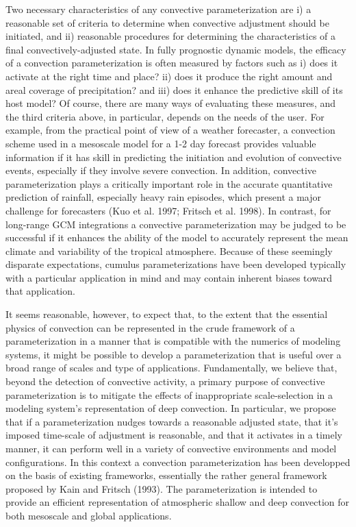 Two necessary characteristics of any convective parameterization are i) a
reasonable set of criteria to determine when convective adjustment should be
initiated, and ii) reasonable procedures for determining the characteristics of
a final convectively-adjusted state.
 In fully
prognostic dynamic models, the efficacy of a convection parameterization is
often measured by factors such as  i)  does it activate at the right time and
place?  ii)  does it produce the right amount and areal coverage of
precipitation?  and iii)  does it enhance the predictive skill of
its host model?
Of course, there are many ways of evaluating these measures, and the third
criteria above, in particular, depends on the needs of the user.  For example,
from the practical point of view of a weather forecaster, a convection scheme
used in a mesoscale model for a 1-2 day forecast provides valuable information
if it has skill in predicting the initiation and evolution of convective events,
especially if they involve severe convection.  In addition, convective
parameterization plays a critically important role in the accurate quantitative
prediction of rainfall, especially heavy rain episodes, which present a major
challenge for forecasters (Kuo et al. 1997; Fritsch et al. 1998).
In contrast,  for long-range
GCM integrations a convective parameterization may be judged to be successful if
it enhances the ability of the model to accurately represent the mean climate
and variability of the tropical atmosphere.  Because of these seemingly
disparate expectations, cumulus parameterizations have been developed typically
with a particular application in mind and may contain inherent biases toward
that application.

It seems reasonable, however, to expect that, to the extent that the essential
physics of convection can be represented in the crude framework of a
parameterization in a manner that is compatible with the numerics of modeling
systems, it might be possible to develop a parameterization that is useful over
a broad range of scales and type of applications.  Fundamentally, we believe
that, beyond the detection of convective activity, a primary purpose of
convective parameterization is to mitigate the effects of inappropriate
scale-selection in a modeling system's representation of deep convection.  In
particular,  we propose that if a parameterization nudges towards a reasonable
adjusted state, that it's imposed time-scale of adjustment is reasonable, and
that it activates in a timely manner, it can perform well in a variety of
convective environments and model configurations.
In this context a convection parameterization has been developped
on the basis of existing frameworks,
essentially the rather general framework proposed by Kain and Fritsch (1993).
The parameterization is intended to provide an efficient representation
of atmospheric
shallow and deep convection for both mesoscale and global applications.


